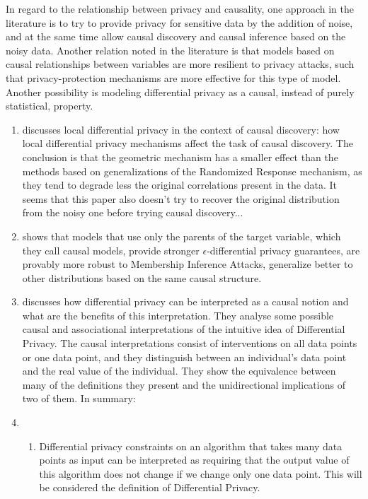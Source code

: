 In regard to the relationship between privacy and causality, one approach in the literature is to try to provide privacy for sensitive data by the addition of noise, and at the same time allow causal discovery and causal inference based on the noisy data. Another relation noted in the literature is that models based on causal relationships between variables are more resilient to privacy attacks, such that privacy-protection mechanisms are more effective for this type of model. Another possibility is modeling differential privacy as a causal, instead of purely statistical, property. 

\begin{enumerate}
\item \cite{Causal Discovery Under Local Privacy} discusses local differential privacy in the context of causal discovery: how local differential privacy mechanisms affect the task of causal discovery. The conclusion is that the geometric mechanism has a smaller effect than the methods based on generalizations of the Randomized Response mechanism, as they tend to degrade less the original correlations present in the data. It seems that this paper also doesn't try to recover the original distribution from the noisy one before trying causal discovery...
\item \cite{Alleviating Privacy Attacks via Causal Learning} shows that models that use only the parents of the target variable, which they call causal models, provide stronger $\epsilon$-differential privacy guarantees, are provably more robust to Membership Inference Attacks, generalize better to other distributions based on the same causal structure.
\item \cite{SoK: Differential Privacy as a Causal Property} discusses how differential privacy can be interpreted as a causal notion and what are the benefits of this interpretation. They analyse some possible causal and associational interpretations of the intuitive idea of Differential Privacy. The causal interpretations consist of interventions on all data points or one data point, and they distinguish between an individual's data point and the real value of the individual. They show the equivalence between many of the definitions they present and the unidirectional implications of two of them. In summary:
\item \begin{enumerate}
    \item Differential privacy constraints on an algorithm that takes many data points as input can be interpreted as requiring that the output value of this algorithm does not change if we change only one data point. This will be considered the definition of Differential Privacy.

\end{enumerate}
\end{enumerate}
